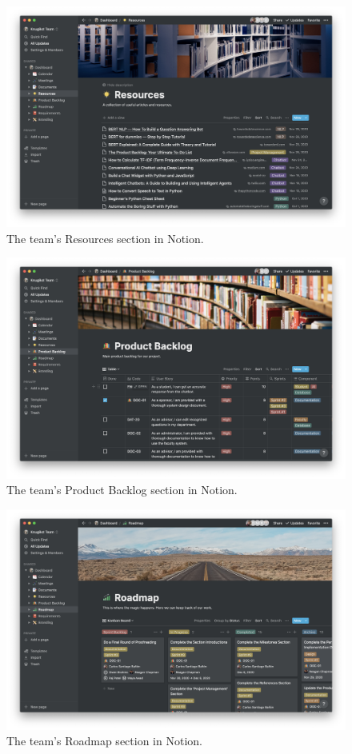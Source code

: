 \documentclass[titlepage, 12pt]{article}
\begin{document}
\begin{figure}[p]
    \centering\includegraphics[width=1\linewidth]{images/pm/resources.png}
    \caption{The team's Resources section in Notion.}
\end{figure}

\begin{figure}[p]
    \centering\includegraphics[width=1\linewidth]{images/pm/product-backlog.png}
    \caption{The team's Product Backlog section in Notion.}
\end{figure}

\begin{figure}[p]
    \centering\includegraphics[width=1\linewidth]{images/pm/roadmap.png}
    \caption{The team's Roadmap section in Notion.}
\end{figure}
\end{document}
